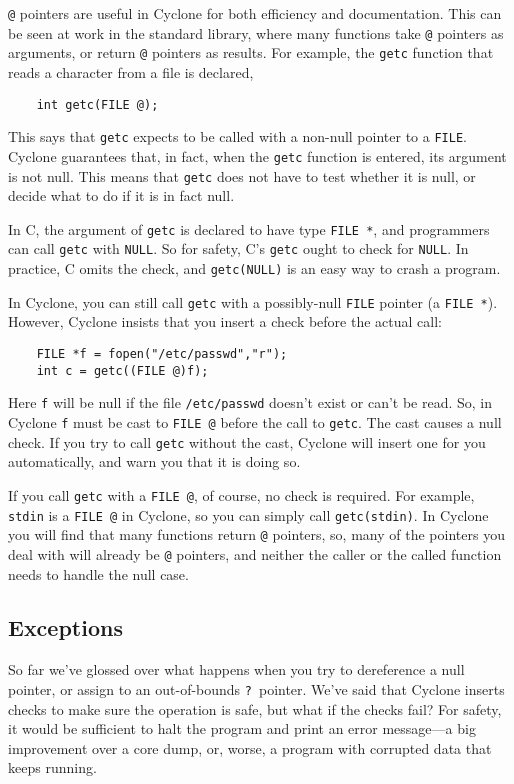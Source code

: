 \texttt{@} pointers are useful in Cyclone for both efficiency and
documentation.  This can be seen at work in the standard library,
where many functions take \texttt{@} pointers as arguments, or return
\texttt{@} pointers as results.  For example, the \texttt{getc}
function that reads a character from a file is declared,
\begin{verbatim}
    int getc(FILE @);
\end{verbatim}
This says that \texttt{getc} expects to be called with a non-null
pointer to a \texttt{FILE}\@.  Cyclone guarantees that, in fact, when
the \texttt{getc} function is entered, its argument is not null.  This
means that \texttt{getc} does not have to test whether it is null, or
decide what to do if it is in fact null.

In C, the argument of \texttt{getc} is declared to have type
\texttt{FILE *}, and programmers can call \texttt{getc} with
\texttt{NULL}\@.  So for safety, C's \texttt{getc} ought to check for
\texttt{NULL}\@.  In practice, C omits the check, and
\texttt{getc(NULL)} is an easy way to crash a program.

In Cyclone, you can still call \texttt{getc} with a possibly-null
\texttt{FILE} pointer (a \texttt{FILE *}).  However, Cyclone insists
that you insert a check before the actual call:
\begin{verbatim}
    FILE *f = fopen("/etc/passwd","r");
    int c = getc((FILE @)f);
\end{verbatim}
Here \texttt{f} will be null if the file \texttt{/etc/passwd} doesn't
exist or can't be read.  So, in Cyclone \texttt{f} must be cast to
\texttt{FILE @} before the call to \texttt{getc}.  The cast causes a
null check.  If you try to call \texttt{getc} without the cast,
Cyclone will insert one for you automatically, and warn you that it is
doing so.

If you call \texttt{getc} with a \texttt{FILE @}, of course, no check
is required.  For example, \texttt{stdin} is a \texttt{FILE @} in
Cyclone, so you can simply call \texttt{getc(stdin)}.  In Cyclone you
will find that many functions return \texttt{@} pointers, so, many of
the pointers you deal with will already be \texttt{@} pointers, and
neither the caller or the called function needs to handle the null
case.

\subsection{Exceptions}

So far we've glossed over what happens when you try to dereference a
null pointer, or assign to an out-of-bounds \texttt{?}\ pointer.
We've said that Cyclone inserts checks to make sure the operation is
safe, but what if the checks fail?  For safety, it would be sufficient
to halt the program and print an error message---a big improvement
over a core dump, or, worse, a program with corrupted data that keeps
running.

